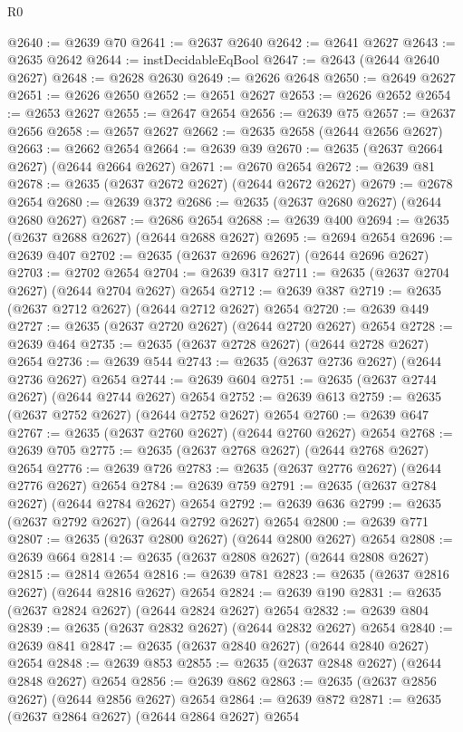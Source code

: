 \begin{lexlean}{R0}
\begin{coremodule}
@2640 := @2639 @70
@2641 := @2637 @2640
@2642 := @2641 @2627
@2643 := @2635 @2642
@2644 := instDecidableEqBool
@2647 := @2643 (@2644 @2640 @2627)
@2648 := @2628 @2630
@2649 := @2626 @2648
@2650 := @2649 @2627
@2651 := @2626 @2650
@2652 := @2651 @2627
@2653 := @2626 @2652
@2654 := @2653 @2627
@2655 := @2647 @2654
@2656 := @2639 @75
@2657 := @2637 @2656
@2658 := @2657 @2627
@2662 := @2635 @2658 (@2644 @2656 @2627)
@2663 := @2662 @2654
@2664 := @2639 @39
@2670 := @2635 (@2637 @2664 @2627) (@2644 @2664 @2627)
@2671 := @2670 @2654
@2672 := @2639 @81
@2678 := @2635 (@2637 @2672 @2627) (@2644 @2672 @2627)
@2679 := @2678 @2654
@2680 := @2639 @372
@2686 := @2635 (@2637 @2680 @2627) (@2644 @2680 @2627)
@2687 := @2686 @2654
@2688 := @2639 @400
@2694 := @2635 (@2637 @2688 @2627) (@2644 @2688 @2627)
@2695 := @2694 @2654
@2696 := @2639 @407
@2702 := @2635 (@2637 @2696 @2627) (@2644 @2696 @2627)
@2703 := @2702 @2654
@2704 := @2639 @317
@2711 := @2635 (@2637 @2704 @2627) (@2644 @2704 @2627) @2654
@2712 := @2639 @387
@2719 := @2635 (@2637 @2712 @2627) (@2644 @2712 @2627) @2654
@2720 := @2639 @449
@2727 := @2635 (@2637 @2720 @2627) (@2644 @2720 @2627) @2654
@2728 := @2639 @464
@2735 := @2635 (@2637 @2728 @2627) (@2644 @2728 @2627) @2654
@2736 := @2639 @544
@2743 := @2635 (@2637 @2736 @2627) (@2644 @2736 @2627) @2654
@2744 := @2639 @604
@2751 := @2635 (@2637 @2744 @2627) (@2644 @2744 @2627) @2654
@2752 := @2639 @613
@2759 := @2635 (@2637 @2752 @2627) (@2644 @2752 @2627) @2654
@2760 := @2639 @647
@2767 := @2635 (@2637 @2760 @2627) (@2644 @2760 @2627) @2654
@2768 := @2639 @705
@2775 := @2635 (@2637 @2768 @2627) (@2644 @2768 @2627) @2654
@2776 := @2639 @726
@2783 := @2635 (@2637 @2776 @2627) (@2644 @2776 @2627) @2654
@2784 := @2639 @759
@2791 := @2635 (@2637 @2784 @2627) (@2644 @2784 @2627) @2654
@2792 := @2639 @636
@2799 := @2635 (@2637 @2792 @2627) (@2644 @2792 @2627) @2654
@2800 := @2639 @771
@2807 := @2635 (@2637 @2800 @2627) (@2644 @2800 @2627) @2654
@2808 := @2639 @664
@2814 := @2635 (@2637 @2808 @2627) (@2644 @2808 @2627)
@2815 := @2814 @2654
@2816 := @2639 @781
@2823 := @2635 (@2637 @2816 @2627) (@2644 @2816 @2627) @2654
@2824 := @2639 @190
@2831 := @2635 (@2637 @2824 @2627) (@2644 @2824 @2627) @2654
@2832 := @2639 @804
@2839 := @2635 (@2637 @2832 @2627) (@2644 @2832 @2627) @2654
@2840 := @2639 @841
@2847 := @2635 (@2637 @2840 @2627) (@2644 @2840 @2627) @2654
@2848 := @2639 @853
@2855 := @2635 (@2637 @2848 @2627) (@2644 @2848 @2627) @2654
@2856 := @2639 @862
@2863 := @2635 (@2637 @2856 @2627) (@2644 @2856 @2627) @2654
@2864 := @2639 @872
@2871 := @2635 (@2637 @2864 @2627) (@2644 @2864 @2627) @2654

\end{coremodule}
\end{lexlean}
